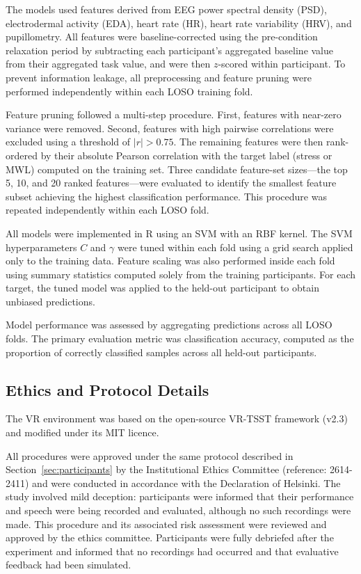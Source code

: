 \documentclass[lettersize,journal]{IEEEtran}
\begin{document}
The models used features derived from EEG power spectral density (PSD), electrodermal activity (EDA), heart rate (HR), heart rate variability (HRV), and pupillometry. All features were baseline-corrected using the pre-condition relaxation period by subtracting each participant's aggregated baseline value from their aggregated task value, and were then $z$-scored within participant. To prevent information leakage, all preprocessing and feature pruning were performed independently within each LOSO training fold.

Feature pruning followed a multi-step procedure. First, features with near-zero variance were removed. Second, features with high pairwise correlations were excluded using a threshold of $|r| > 0.75$. The remaining features were then rank-ordered by their absolute Pearson correlation with the target label (stress or MWL) computed on the training set. Three candidate feature-set sizes—the top 5, 10, and 20 ranked features—were evaluated to identify the smallest feature subset achieving the highest classification performance. This procedure was repeated independently within each LOSO fold.

All models were implemented in R using an SVM with an RBF kernel. The SVM hyperparameters $C$ and $\gamma$ were tuned within each fold using a grid search applied only to the training data. Feature scaling was also performed inside each fold using summary statistics computed solely from the training participants. For each target, the tuned model was applied to the held-out participant to obtain unbiased predictions.

Model performance was assessed by aggregating predictions across all LOSO folds. The primary evaluation metric was classification accuracy, computed as the proportion of correctly classified samples across all held-out participants.

\subsection{Ethics and Protocol Details}
The VR environment was based on the open-source VR-TSST framework (v2.3) and modified under its MIT licence.

All procedures were approved under the same protocol described in Section~\ref{sec:participants} by the Institutional Ethics Committee (reference: 2614-2411) and were conducted in accordance with the Declaration of Helsinki. 
The study involved mild deception: participants were informed that their performance and speech were being recorded and evaluated, although no such recordings were made. 
This procedure and its associated risk assessment were reviewed and approved by the ethics committee. 
Participants were fully debriefed after the experiment and informed that no recordings had occurred and that evaluative feedback had been simulated.
\end{document}
